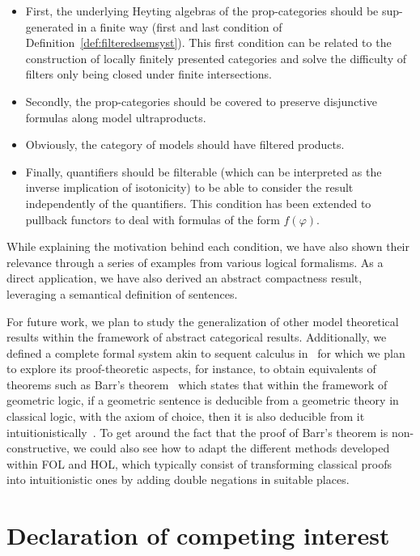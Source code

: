 \documentclass[preprint,3p,times]{elsarticle}
\begin{document}
\begin{itemize}
    \item First, the underlying Heyting algebras of the prop-categories should be sup-generated in a finite way (first and last condition of Definition~\ref{def:filteredsemsyst}). This first condition can be related to the construction of locally finitely presented categories and solve the difficulty of filters only being closed under finite intersections.
    \item Secondly, the prop-categories should be covered to preserve disjunctive formulas along model ultraproducts.
    \item Obviously, the category of models should have filtered products.
    \item Finally, quantifiers should be filterable (which can be interpreted as the inverse implication of isotonicity) to be able to consider the result independently of the quantifiers. This condition has been extended to pullback functors to deal with formulas of the form $f(\varphi)$.
\end{itemize}

While explaining the motivation behind each condition, we have also shown their relevance through a series of examples from various logical formalisms. As a direct application, we have also derived an abstract compactness result, leveraging a semantical definition of sentences.

\medskip
For future work, we plan to study the generalization of other model theoretical results within the framework of abstract categorical results. Additionally, we defined a complete formal system akin to sequent calculus in~\cite{AB23} for which we plan to explore its proof-theoretic aspects, for instance, to obtain equivalents of theorems such as Barr's theorem~\cite{barr_toposes_1974} which states that within the framework of geometric logic, if a geometric sentence is deducible from a geometric theory in classical logic, with the axiom of choice, then it is also deducible from it intuitionistically~\cite{Wraith78}. To get around the fact that the proof of Barr's theorem is non-constructive, we could also see how to adapt the different methods developed within FOL and HOL, which typically consist of transforming classical proofs into intuitionistic ones by adding double negations in suitable places.

\section*{Declaration of competing interest}
\end{document}
